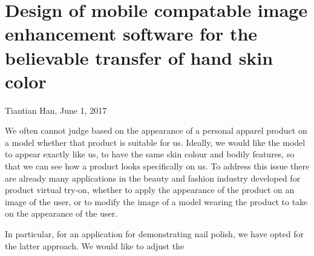 \documentclass[12pt, a4paper]{article}
\begin{document}
\section*{Design of mobile compatable image enhancement software for the believable transfer of hand skin color}
Tiantian Han, June 1, 2017

We often cannot judge based on the appearance of a personal apparel product on a model whether that product is suitable for us. Ideally, we would like the model to appear exactly like us, to have the same skin colour and bodily features, so that we can see how a product looks specifically on us. To address this issue there are already many applications in the beauty and fashion industry developed for product virtual try-on, whether to apply the appearance of the product on an image of the user, or to modify the image of a model wearing the product to take on the appearance of the user.

In particular, for an application for demonstrating nail polish, we have opted for the latter approach. We would like to adjust the 





\pagebreak



\pagebreak
\end{document}

